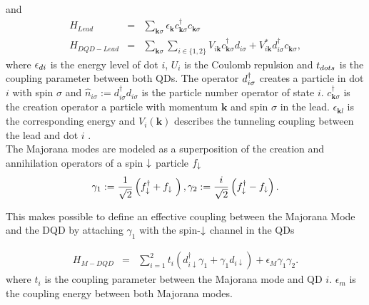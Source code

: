 \documentclass[showpacs,aps,prb,reprint,superscriptaddress]{revtex4-1}
\begin{document}
and 
\begin{eqnarray}
H_{Lead} & = & \sum_{\mathbf{k}\sigma }\epsilon_{\mathbf{k}}c_{\mathbf{k}\sigma }^{\dagger}c_{\mathbf{k}\sigma } \label{eq:H_L}\\ 
H_{DQD-Lead} & = &  \sum_{\mathbf{k}\sigma }\sum_{i\in\{1,2\}}V_{i\textbf{k}} c_{\mathbf{k}\sigma }^{\dagger}d_{i\sigma}+V^*_{i\textbf{k}} d_{i\sigma}^{\dagger}c_{\mathbf{k}\sigma }  \label{eq:H_DQDL},
\end{eqnarray}
%
where $\epsilon_{di}$ is the energy level of dot $i$, $U_i$ is the Coulomb repulsion and $t_{dots}$ is the coupling parameter between both QDs. The operator $d^{\dagger}_{i\sigma}$ creates a particle in dot $i$ with spin $\sigma$ and $\hat{n}_{i\sigma}:=d_{i\sigma}^{\dagger}d_{i\sigma}$ is the particle number operator of state $i$.  $c_{\mathbf{k}\sigma }^{\dagger}$ is the creation operator a particle with momentum $\mathbf{k}$ and spin
$\sigma$ in the lead.  $\epsilon_{\mathbf{k}l}$ is the corresponding energy
 and $V_i(\textbf{k})$ describes the tunneling coupling between the lead and dot $i$ . \\


The Majorana modes are modeled as a superposition of the creation and annihilation operators of a spin $\downarrow$ particle $f_\downarrow$
\begin{equation}
    \gamma_1 := \frac{1}{\sqrt{2}} \left( f^\dagger_{\downarrow} + f_{\downarrow}\ \right) , \gamma_2 := \frac{i}{\sqrt{2}} \left( f^\dagger_{\downarrow} - f_{\downarrow} \right). \label{eq:MajOp}
\end{equation}


This makes possible to define an effective coupling between the Majorana Mode and the DQD by attaching $\gamma_1$ with the spin-$\downarrow$ channel in the QDs

\begin{eqnarray}
	H_{M-DQD} & = &  \sum_{i=1}^2t_{i} \left(d_{i\downarrow}^{\dagger}\gamma_{1}+\gamma_{1}d_{i\downarrow}\right) + \epsilon_M \gamma_1\gamma_2. 
	\label{eq:H_MDQD}
\end{eqnarray}
where $t_i$ is the coupling parameter between the Majorana mode and QD $i$. $\epsilon_m$ is the coupling energy between both Majorana modes.
\end{document}
